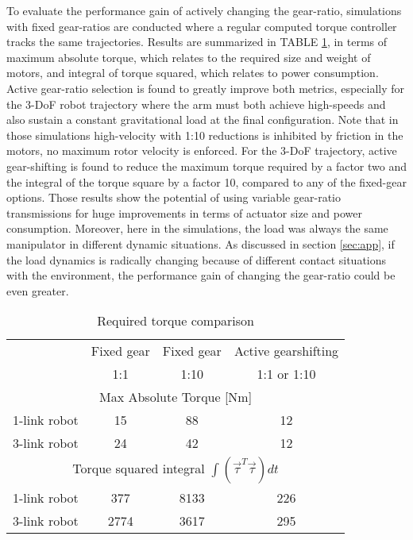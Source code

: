 To evaluate the performance gain of actively changing the gear-ratio, simulations with fixed gear-ratios are conducted where a regular computed torque controller tracks the same trajectories. Results are summarized in TABLE \ref{tab:MaximumTorqueComparison}, in terms of maximum absolute torque, which relates to the required size and weight of motors, and integral of torque squared, which relates to power consumption. Active gear-ratio selection is found to greatly improve both metrics, especially for the 3-DoF robot trajectory where the arm must both achieve high-speeds and also sustain a constant gravitational load at the final configuration. Note that in those simulations high-velocity with 1:10 reductions is inhibited by friction in the motors, no maximum rotor velocity is enforced. For the 3-DoF trajectory, active gear-shifting is found to reduce the maximum torque required by a factor two and the integral of the torque square by a factor 10, compared to any of the fixed-gear options. Those results show the potential of using variable gear-ratio transmissions for huge improvements in terms of actuator size and power consumption. Moreover, here in the simulations, the load was always the same manipulator in different dynamic situations. As discussed in section \ref{sec:app}, if the load dynamics is radically changing because of different contact situations with the environment, the performance gain of changing the gear-ratio could be even greater. 
%
\begin{table}[htp]
	\centering
		\caption{Required torque comparison}
		\begin{tabular}{ c c c c }
		\hline
		     & Fixed gear & Fixed gear & Active gearshifting \\
			& 1:1 &  1:10 &  1:1 or 1:10 \\
		\hline \hline
		\multicolumn{4}{c}{ Max Absolute Torque [Nm] } \\
		\hline \hline
		1-link robot  & 15 & 88 & 12 \\	
		3-link robot  & 24 & 42 & 12 \\	
		\hline \hline
		\multicolumn{4}{c}{ Torque squared integral $\int{ ( \vec{\tau}^T \vec{\tau} ) dt }$ } \\
		\hline \hline
		1-link robot  & 377  & 8133 & 226  \\	
		3-link robot  & 2774 & 3617 & 295  \\	
		\hline \hline
		\end{tabular}
	\label{tab:MaximumTorqueComparison}
\end{table}
%


